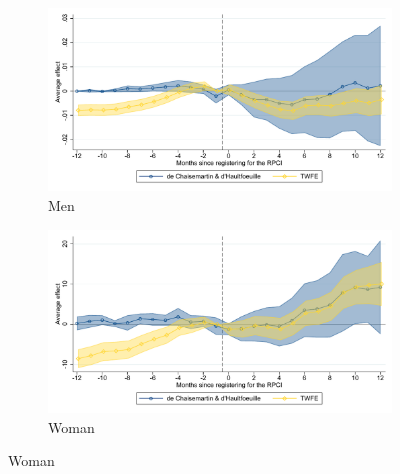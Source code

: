 \begin{figure}[H]
    \centering
    \caption{Event studies - RPCI effect on enrollment \label{fig:event_study_het_wrkr}}
    
    \begin{subfigure}{0.49\textwidth}
    \caption{Men}
    \includegraphics[width=\textwidth]{04_Figures/muestra_10porciento/event_study_alta_connected.pdf}
    \end{subfigure}
    \begin{subfigure}{0.49\textwidth}
    \caption{Woman}
    \includegraphics[width=\textwidth]{04_Figures/muestra_10porciento/event_study_sal_formal_connected.pdf}
    \end{subfigure}
    

\end{figure}
